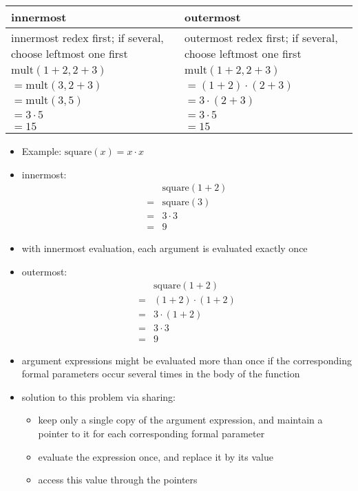\begin{multicols}{2}
\begin{tabular}{|p{0.5\linewidth}|p{0.5\linewidth}|}
  \hline
  \textbf{innermost} & \textbf{outermost}\\
  \hline
  innermost redex first; if several, choose leftmost one first & outermost redex first; if several, choose leftmost one first\\
  \hline
  $\text{mult}(1 + 2, 2 + 3)$ & $\text{mult}(1 + 2, 2 + 3)$\\
  $= \text{mult}(3, 2 + 3)$ & $= (1 + 2) \cdot (2 + 3)$\\
  $= \text{mult}(3, 5)$ & $= 3 \cdot (2 + 3)$\\
  $= 3 \cdot 5$ & $= 3 \cdot 5$\\
  $= 15$ & $= 15$\\
  \hline
\end{tabular}
\begin{itemize}
  \item Example: $\text{square}(x) = x \cdot x$
  \item innermost:
  \begin{align*}
    &\text{square}(1 + 2)\\
    =&\text{square}(3)\\
    =&3 \cdot 3\\
    =&9
  \end{align*}
  \item with innermost evaluation, each argument is evaluated exactly once
  \item outermost:
  \begin{align*}
    &\text{square}(1 + 2)\\
    =&(1 + 2) \cdot (1 + 2)\\
    =&3 \cdot (1 + 2)\\
    =&3 \cdot 3\\
    =&9
  \end{align*}
  \item argument expressions might be evaluated more than once if the corresponding formal parameters occur several times in the body of the function
  \item solution to this problem via sharing:
  \begin{itemize}
    \item keep only a single copy of the argument expression, and maintain a pointer to it for each corresponding formal parameter
    \item evaluate the expression once, and replace it by its value
    \item access this value through the pointers
  \end{itemize}
\end{itemize}


\end{multicols}
